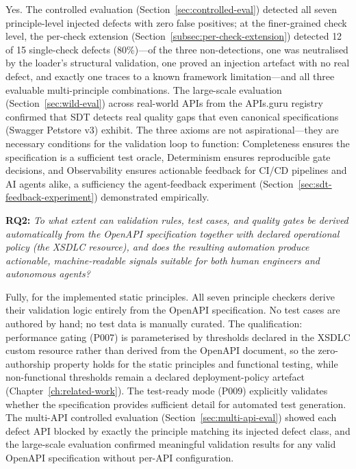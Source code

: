 Yes. The controlled evaluation (Section~\ref{sec:controlled-eval}) detected all seven principle-level injected defects with zero false positives; at the finer-grained check level, the per-check extension (Section~\ref{subsec:per-check-extension}) detected 12 of 15 single-check defects (80\%)---of the three non-detections, one was neutralised by the loader's structural validation, one proved an injection artefact with no real defect, and exactly one traces to a known framework limitation---and all three evaluable multi-principle combinations. The large-scale evaluation (Section~\ref{sec:wild-eval}) across real-world APIs from the APIs.guru registry confirmed that SDT detects real quality gaps that even canonical specifications (Swagger Petstore v3) exhibit. The three axioms are not aspirational---they are necessary conditions for the validation loop to function: Completeness ensures the specification is a sufficient test oracle, Determinism ensures reproducible gate decisions, and Observability ensures actionable feedback for CI/CD pipelines and AI agents alike, a sufficiency the agent-feedback experiment (Section~\ref{sec:sdt-feedback-experiment}) demonstrated empirically.

\textbf{RQ2:} \textit{To what extent can validation rules, test cases, and quality gates be derived automatically from the OpenAPI specification together with declared operational policy (the XSDLC resource), and does the resulting automation produce actionable, machine-readable signals suitable for both human engineers and autonomous agents?}

Fully, for the implemented static principles. All seven principle checkers derive their validation logic entirely from the OpenAPI specification. No test cases are authored by hand; no test data is manually curated. The qualification: performance gating (P007) is parameterised by thresholds declared in the XSDLC custom resource rather than derived from the OpenAPI document, so the zero-authorship property holds for the static principles and functional testing, while non-functional thresholds remain a declared deployment-policy artefact (Chapter~\ref{ch:related-work}). The test-ready mode (P009) explicitly validates whether the specification provides sufficient detail for automated test generation. The multi-API controlled evaluation (Section~\ref{sec:multi-api-eval}) showed each defect API blocked by exactly the principle matching its injected defect class, and the large-scale evaluation confirmed meaningful validation results for any valid OpenAPI specification without per-API configuration.

